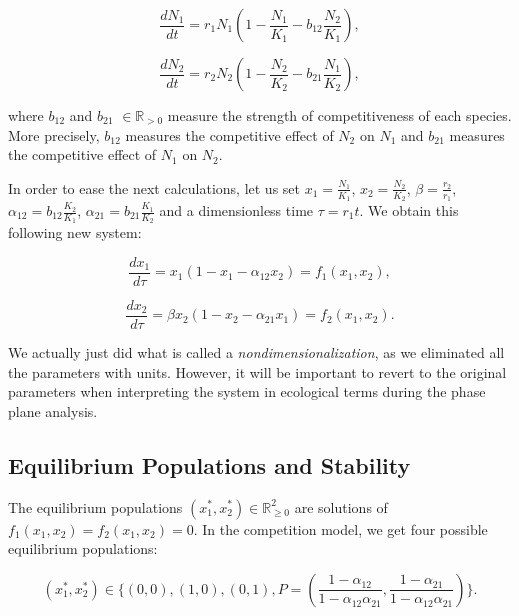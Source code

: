 \documentclass[11pt,a4paper]{scrartcl}
\theoremstyle{definition}
\begin{document}
\begin{equation} \label{eq12}
	\frac{dN_1}{dt}=r_1N_1(1-\frac{N_1}{K_1}-b_{12}\frac{N_2}{K_1}),
\end{equation}

\begin{equation} \label{eq13}
	\frac{dN_2}{dt}=r_2N_2(1-\frac{N_2}{K_2}-b_{21}\frac{N_1}{K_2}),
\end{equation}

where $b_{12}$ and $b_{21}$ $\in \mathbb{R}_{>0}$ measure the strength of competitiveness of each species. More precisely, 
$b_{12}$ measures the competitive effect of $N_2$ on $N_1$ and $b_{21}$ measures the competitive effect of $N_1$ on $N_2$.
\newline

In order to ease the next calculations, let us set $x_1=\frac{N_1}{K_1}$, $x_2=\frac{N_2}{K_2}$, $\beta=\frac{r_2}{r_1}$, $\alpha_{12}=b_{12}\frac{K_2}{K_1}$, $\alpha_{21}=b_{21}\frac{K_1}{K_2}$ and a dimensionless time $\tau=r_1t$. We obtain this following new system:

\begin{equation} \label{eq14}
	\frac{dx_1}{d\tau}=x_1(1-x_1-\alpha_{12}x_2)=f_1(x_1, x_2),
\end{equation}

\begin{equation} \label{eq15}
	\frac{dx_2}{d\tau}=\beta x_2(1-x_2-\alpha_{21}x_1)=f_2(x_1, x_2).
\end{equation}

We actually just did what is called a \textit{nondimensionalization}, as we eliminated all the parameters with units. However, it will be important to revert to the original parameters when interpreting the system in ecological terms during the phase plane analysis.

\subsection{Equilibrium Populations and Stability}

The equilibrium populations $(x_1^{*}, x_2^{*}) \in \mathbb{R}^2_{\geqslant 0}$ are solutions of $f_1(x_1, x_2)=f_2(x_1, x_2)=0$. In the competition model, we get four possible equilibrium populations:

\begin{equation*} 
	(x_1^{*}, x_2^{*})\in\Big\{(0,0), (1,0), (0,1), P=(\frac{1-\alpha_{12}}{1-\alpha_{12}\alpha_{21}}, \frac{1-\alpha_{21}}{1-\alpha_{12}\alpha_{21}}) \Big\}.
\end{equation*}
\end{document}
